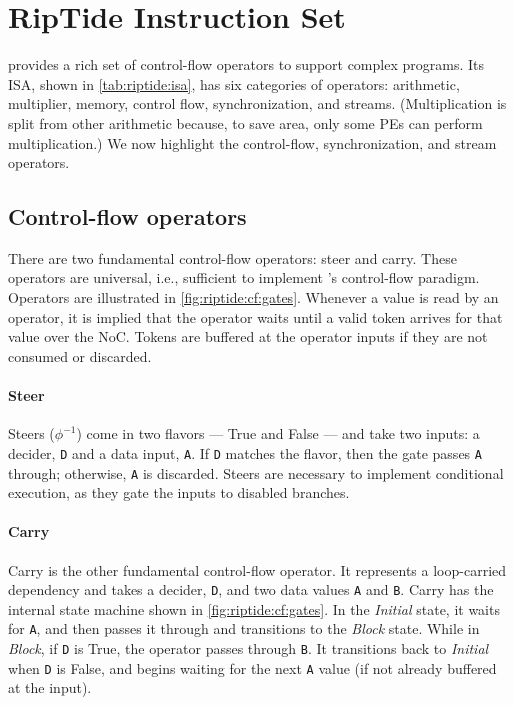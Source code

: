 \section{RipTide Instruction Set}
\label{riptide:cf}

\riptide provides a rich set of control-flow operators to support complex programs.
% 
Its ISA, shown in \autoref{tab:riptide:isa}, has six categories of operators: arithmetic, multiplier, memory, control flow, synchronization, and streams.
%
(Multiplication is split from other arithmetic because, to save area, only some PEs can perform multiplication.)
%
We now highlight the control-flow, synchronization, and stream operators.

\subsection{Control-flow operators}
There are two fundamental control-flow operators: steer and carry.
% 
These operators are universal, i.e., sufficient to implement \riptide's control-flow paradigm.
%
Operators are illustrated in \autoref{fig:riptide:cf:gates}.
%
Whenever a value is read by an operator, it is implied that the
operator waits until a valid token arrives for that value over the
NoC. Tokens are buffered at the operator inputs if they are not
consumed or discarded.

\figRipTideISA

\paragraph{Steer} 
Steers ($\phi^{-1}$) come in two flavors --- True and False --- and take two inputs: a decider, {\tt D} and a data input, {\tt A}.
% 
If {\tt D} matches the flavor, then the gate passes {\tt A} through; otherwise, {\tt A} is discarded.
% 
Steers are necessary to implement conditional execution, as they gate the inputs to disabled branches.

\paragraph{Carry}
Carry is the other fundamental control-flow operator.
% 
It represents a loop-carried dependency and takes a decider, {\tt D}, and two data values {\tt A} and {\tt B}.
% 
Carry has the internal state machine shown in \autoref{fig:riptide:cf:gates}.
%
In the {\em Initial} state, it waits for {\tt A}, and then passes it through and transitions to the {\em Block} state.
%
While in {\em Block}, if {\tt D} is True, the operator passes through {\tt B}.
%
It transitions back to {\em Initial} when {\tt D} is False, and begins waiting for the next {\tt A} value (if not already buffered at the input).

